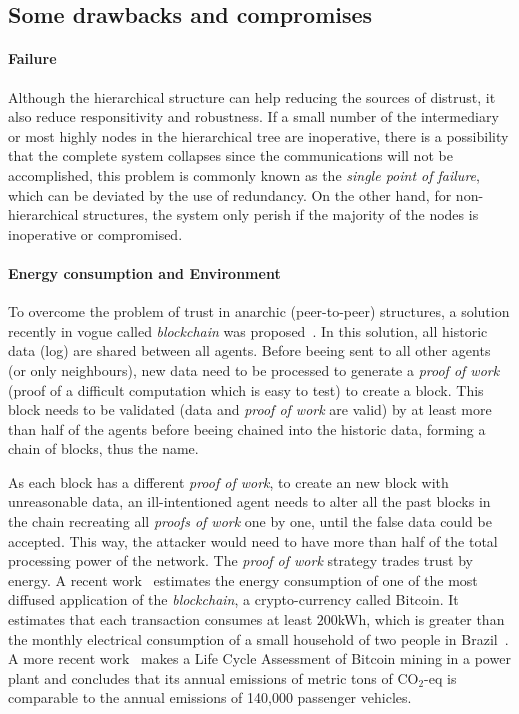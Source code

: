 \documentclass[../main.tex]{subfiles}
\begin{document}
\subsection{Some drawbacks and compromises}\label{sec:drawbacks}

\paragraph{Failure}
Although the hierarchical structure can help reducing the sources of distrust, it also reduce responsitivity and robustness.
If a small number of the intermediary or most highly nodes in the hierarchical tree are inoperative, there is a possibility that the complete system collapses since the communications will not be accomplished, this problem is commonly known as the \emph{single point of failure}, which can be deviated by the use of redundancy.
On the other hand, for non-hierarchical structures, the system only perish if the majority of the nodes is inoperative or compromised.

\paragraph{Energy consumption and Environment}
To overcome the problem of trust in anarchic (peer-to-peer) structures, a solution recently in vogue called \emph{blockchain} was proposed~\cite{Nakamoto2008}.
In this solution, all historic data (log) are shared between all agents.
Before beeing sent to all other agents (or only neighbours), new data need to be processed to generate a \emph{proof of work} (proof of a difficult computation which is easy to test) to create a block.
This block needs to be validated (data and \emph{proof of work} are valid) by at least more than half of the agents before beeing chained into the historic data, forming a chain of blocks, thus the name.

As each block has a different \emph{proof of work}, to create an new block with unreasonable data, an ill-intentioned agent needs to alter all the past blocks in the chain recreating all \emph{proofs of work} one by one, until the false data could be accepted.
This way, the attacker would need to have more than half of the total processing power of the network.
The \emph{proof of work} strategy trades trust by energy.
A recent work~\cite{ColeCheng2018} estimates the energy consumption of one of the most diffused application of the \emph{blockchain}, a crypto-currency called Bitcoin.
It estimates that each transaction consumes at least $200$kWh, which is greater than the monthly electrical consumption of a small household of two people in Brazil~\cite{EPE2022}.
A more recent work~\cite{RoeckDrennen2022} makes a Life Cycle Assessment of Bitcoin mining in a power plant and concludes that its annual emissions of metric tons of CO$_2$-eq is comparable to the annual emissions of 140,000 passenger vehicles.
\end{document}
